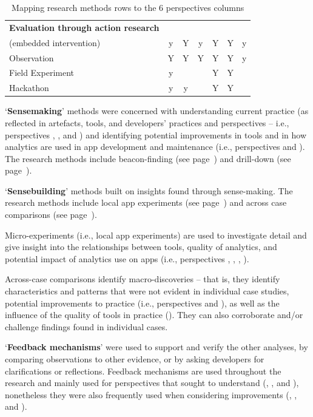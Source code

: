 \begin{table}
\begin{tabular}{l|ccc|ccc}
        \hline
        \textbf{Evaluation through action research} & & & & & & \\
        (embedded intervention) &y &Y &y &Y &Y &y \\
        Observation             &Y &Y &Y &Y &Y &y \\
        Field Experiment        &y &  &  &Y &Y &  \\
        Hackathon               &y &y &  &Y &Y &  \\
        
        \bottomrule
    \end{tabular}
    \caption{Mapping research methods rows to the 6 perspectives columns}
    \label{tab:mapping-analysis-to-six-perspectives}
\end{table}


`\textbf{Sensemaking}' methods were concerned with understanding current practice (as reflected in artefacts, tools, and developers' practices and perspectives -- i.e., perspectives \uartefacts, \utools, and \uuse) and identifying potential improvements in tools and in how analytics are used in app development and maintenance (i.e., perspectives \itools and \iartefacts). The research methods include beacon-finding (see page~\pageref{section-beacon-finding-method}) and drill-down (see page~).


`\textbf{Sensebuilding}' methods built on insights found through sense-making. The research methods include local app experiments (see page~\pageref{local-app-experiments-research-method}) and across case comparisons (see page~\pageref{across-case-comparisons-research-method}).

Micro-experiments (i.e., local app experiments) are used to investigate detail and give insight into the relationships between tools, quality of analytics, and potential impact of analytics use on apps (i.e., perspectives \uartefacts, \utools, \iartefacts, \itools).

Across-case comparisons identify macro-discoveries -- that is, they identify characteristics and patterns that were not evident in individual case studies, potential improvements to practice (i.e., perspectives \uuse and \iuse), as well as the influence of the quality of tools in practice (\itools). They can also corroborate and/or challenge findings found in individual cases.


`\textbf{Feedback mechanisms}' were used to support and verify the other analyses, by comparing observations to other evidence, or by asking developers for clarifications or reflections. Feedback mechanisms are used throughout the research and mainly used for perspectives that sought to understand (\uuse, \uartefacts, and \utools), nonetheless they were also frequently used when considering improvements (\iuse, \iartefacts, and \itools). 

